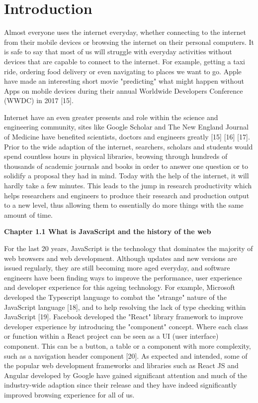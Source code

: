 \chapter{Introduction}

Almost everyone uses the internet everyday, whether connecting to the internet from their mobile devices or browsing the internet on their personal computers. It is safe to say that most of us will struggle with everyday activities without devices that are capable to connect to the internet. For example, getting a taxi ride, ordering food delivery or even navigating to places we want to go. Apple have made an interesting short movie "predicting" what might happen without Apps on mobile devices during their annual Worldwide Developers Conference (WWDC) in 2017 [15].
 
Internet have an even greater presents and role within the science and engineering community, sites like Google Scholar and The New England Journal of Medicine have benefited scientists, doctors and engineers greatly [15] [16] [17]. Prior to the wide adaption of the internet, searchers, scholars and students would spend countless hours in physical libraries, browsing through hundreds of thousands of academic journals and books in order to answer one question or to solidify a proposal they had in mind. Today with the help of the internet, it will hardly take a few minutes. This leads to the jump in research productivity which helps researchers and engineers to produce their research and production output to a new level, thus allowing them to essentially do more things with the same amount of time.

\bigskip
\bigskip

\textbf{{\Large Chapter 1.1 What is JavaScript and the history of the web}}

\bigskip

For the last 20 years, JavaScript is the technology that dominates the majority of web browsers and web development. Although updates and new versions are issued regularly, they are still becoming more aged everyday, and software engineers have been finding ways to improve the performance, user experience and developer experience for this ageing technology. For example, Microsoft developed the Typescript language to combat the "strange" nature of the JavaScript language [18], and to help resolving the lack of type checking within JavaScript [19]. Facebook developed the "React" library framework to improve developer experience by introducing the "component" concept. Where each class or function within a React project can be seen as a UI (user interface) component. This can be a button, a table or a component with more complexity, such as a navigation header component [20]. As expected and intended, some of the popular web development frameworks and libraries such as React JS and Angular developed by Google have gained significant attention and much of the industry-wide adaption since their release and they have indeed significantly improved browsing experience for all of us.


